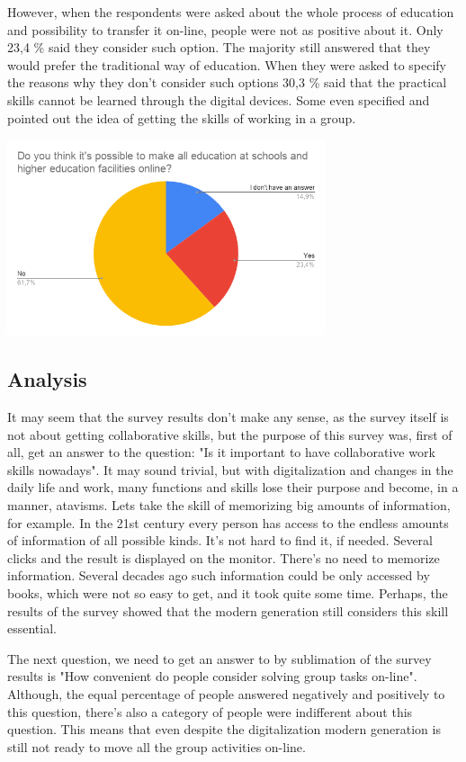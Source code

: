 \documentclass[10pt,oneside,english,a4paper]{article}
\begin{document}
However, when the respondents were asked about the whole process of education and possibility to transfer it on-line, people were not as positive about it. Only 23,4 \% said they consider such option. The majority still answered that they would prefer the traditional way of education. When they were asked to specify the reasons why they don't consider such options 30,3 \% said that the practical skills cannot be learned through the digital devices. Some even specified and pointed out the idea of getting the skills of working in a group. 

\includegraphics[width=0.7\textwidth]{diagram3.png}

\subsection{Analysis} \label{analysis}

It may seem that the survey results don't make any sense, as the survey itself is not about getting collaborative skills, but the purpose of this survey was, first of all, get an answer to the question: "Is it important to have collaborative work skills nowadays". It may sound trivial, but with digitalization and changes in the daily life and work, many functions and skills lose their purpose and become, in a manner, atavisms. Lets take the skill of memorizing big amounts of information, for example. In the 21st century every person has access to the endless amounts of information of all possible kinds. It's not hard to find it, if needed. Several clicks and the result is displayed on the monitor. There's no need to memorize information. Several decades ago such information could be only accessed by books, which were not so easy to get, and it took quite some time. Perhaps, the results of the survey showed that the modern generation still considers this skill essential. \par
The next question, we need to get an answer to by sublimation of the survey results is "How convenient do people consider solving group tasks on-line". Although, the equal percentage of people answered negatively and positively to this question, there's also a category of people were indifferent about this question. This means that even despite the digitalization modern generation is still not ready to move all the group activities on-line.\par
\end{document}
